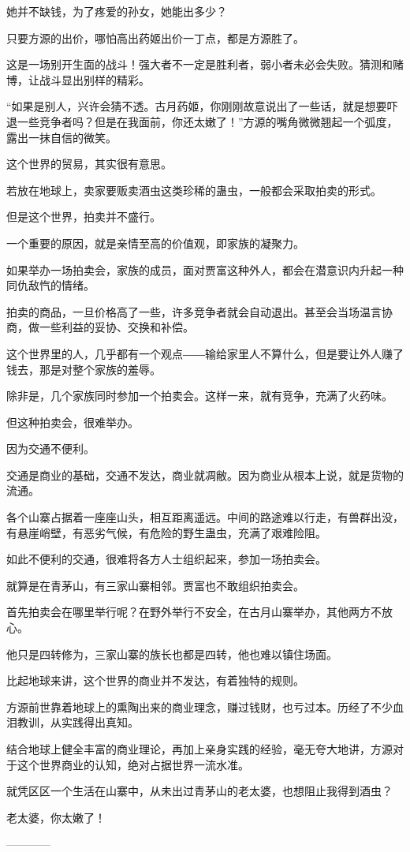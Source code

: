 \begin{this_body}
她并不缺钱，为了疼爱的孙女，她能出多少？

只要方源的出价，哪怕高出药姬出价一丁点，都是方源胜了。

这是一场别开生面的战斗！强大者不一定是胜利者，弱小者未必会失败。猜测和赌博，让战斗显出别样的精彩。

“如果是别人，兴许会猜不透。古月药姬，你刚刚故意说出了一些话，就是想要吓退一些竞争者吗？但是在我面前，你还太嫩了！”方源的嘴角微微翘起一个弧度，露出一抹自信的微笑。

这个世界的贸易，其实很有意思。

若放在地球上，卖家要贩卖酒虫这类珍稀的蛊虫，一般都会采取拍卖的形式。

但是这个世界，拍卖并不盛行。

一个重要的原因，就是亲情至高的价值观，即家族的凝聚力。

如果举办一场拍卖会，家族的成员，面对贾富这种外人，都会在潜意识内升起一种同仇敌忾的情绪。

拍卖的商品，一旦价格高了一些，许多竞争者就会自动退出。甚至会当场温言协商，做一些利益的妥协、交换和补偿。

这个世界里的人，几乎都有一个观点――输给家里人不算什么，但是要让外人赚了钱去，那是对整个家族的羞辱。

除非是，几个家族同时参加一个拍卖会。这样一来，就有竞争，充满了火药味。

但这种拍卖会，很难举办。

因为交通不便利。

交通是商业的基础，交通不发达，商业就凋敝。因为商业从根本上说，就是货物的流通。

各个山寨占据着一座座山头，相互距离遥远。中间的路途难以行走，有兽群出没，有悬崖峭壁，有恶劣气候，有危险的野生蛊虫，充满了艰难险阻。

如此不便利的交通，很难将各方人士组织起来，参加一场拍卖会。

就算是在青茅山，有三家山寨相邻。贾富也不敢组织拍卖会。

首先拍卖会在哪里举行呢？在野外举行不安全，在古月山寨举办，其他两方不放心。

他只是四转修为，三家山寨的族长也都是四转，他也难以镇住场面。

比起地球来讲，这个世界的商业并不发达，有着独特的规则。

方源前世靠着地球上的熏陶出来的商业理念，赚过钱财，也亏过本。历经了不少血泪教训，从实践得出真知。

结合地球上健全丰富的商业理论，再加上亲身实践的经验，毫无夸大地讲，方源对于这个世界商业的认知，绝对占据世界一流水准。

就凭区区一个生活在山寨中，从未出过青茅山的老太婆，也想阻止我得到酒虫？

老太婆，你太嫩了！

------------

\end{this_body}


